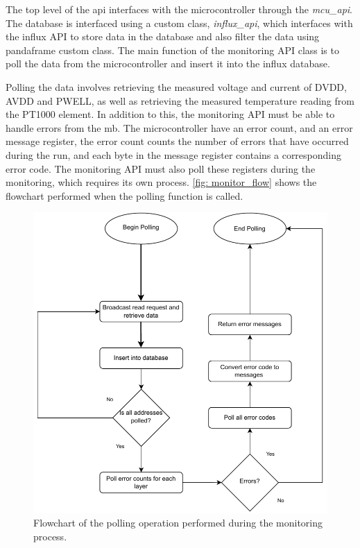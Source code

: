 \documentclass[main.tex]{subfiles}
\begin{document}
The top level of the \gls{api} interfaces with the microcontroller through the \textit{mcu\_api}. The database is interfaced using a custom class, \textit{influx\_api}, which interfaces with the influx API to store data in the database and also filter the data using pandaframe custom class. The main function of the monitoring API class is to poll the data from the microcontroller and insert it into the influx database. 

Polling the data involves retrieving the measured voltage and current of DVDD, AVDD and PWELL, as well as retrieving the measured temperature reading from the PT1000 element. In addition to this, the monitoring API must be able to handle errors from the \gls{mb}. The microcontroller have an error count, and an error message register, the error count counts the number of errors that have occurred during the run, and each byte in the message register contains a corresponding error code. The monitoring API must also poll these registers during the monitoring, which requires its own process. \autoref{fig: monitor_flow} shows the flowchart performed when the polling function is called.

\begin{figure}[!ht]
    \centering
    \includegraphics[scale=0.9]{images/Monitoring Flowchart.pdf}
    \caption{Flowchart of the polling operation performed during the monitoring process.}
    \label{fig: monitor_flow}
\end{figure}
\FloatBarrier
\end{document}
